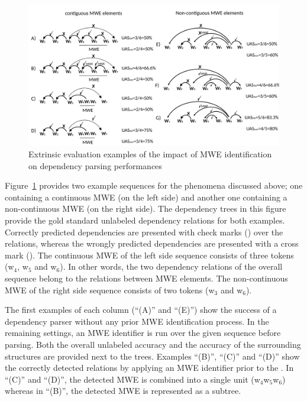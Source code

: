 \documentclass[output=paper]{langsci/langscibook}
\begin{document}
\begin{figure}[htbp]
  \centering
      \includegraphics[width=1.00\textwidth]{figures/Presentation1}
    \caption{Extrinsic evaluation examples of the impact of MWE identification on dependency parsing performances}
	\label{con:fig:example}
\end{figure}


Figure~\ref{con:fig:example} provides two example sequences for the phenomena discussed above; one containing a continuous MWE (on the left side)  and another one containing a non-continuous MWE (on the right side).
The dependency trees in this figure provide the gold standard unlabeled dependency relations for both examples.
Correctly predicted dependencies %
are presented with check marks () over the relations, whereas the wrongly predicted dependencies are presented with a cross mark (). 
The continuous MWE of the left side sequence consists of three tokens (w$_4$, w$_5$ and w$_6$). In other words, the two dependency relations of the overall sequence belong to the relations between MWE elements. The non-continuous MWE of the right side sequence consists of two tokens (w$_3$ and w$_6$).

The first examples of each column (``(A)'' and ``(E)'') show the success of a dependency parser without any prior MWE identification process. 
In the remaining settings, an MWE identifier is run over the given sequence before parsing.
Both the overall unlabeled accuracy \asuo{} and the accuracy of the surrounding structures \asus{} are provided next to the trees. Examples ``(B)'', ``(C)'' and ``(D)'' show the correctly detected relations by applying an MWE identifier prior to the . In ``(C)'' and ``(D)'', the detected MWE is combined into a single unit (w$_4$w$_5$w$_6$) whereas in ``(B)'', the detected MWE is represented as a subtree. %
\end{document}
